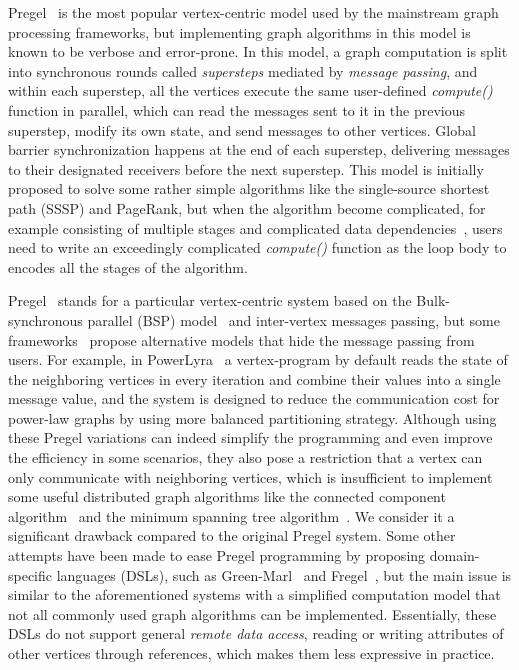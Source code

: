 \documentclass{sokendai_thesis} %
\begin{document}
Pregel~\cite{pregel} is the most popular vertex-centric model used by the mainstream graph processing frameworks, but implementing graph algorithms in this model is known to be verbose and error-prone.
In this model, a graph computation is split into synchronous rounds called \emph{supersteps} mediated by \emph{message passing}, and within each superstep, all the vertices execute the same user-defined \textit{compute()} function in parallel, which can read the messages sent to it in the previous superstep, modify its own state, and send messages to other vertices.
Global barrier synchronization happens at the end of each superstep, delivering messages to their designated receivers before the next superstep.
This model is initially proposed to solve some rather simple algorithms like the single-source shortest path (SSSP) and PageRank, but when the algorithm become complicated, for example consisting of multiple stages and complicated data dependencies~\cite{yan2014pregel}, users need to write an exceedingly complicated \textit{compute()} function as the loop body to encodes all the stages of the algorithm.


Pregel~\cite{pregel} stands for a particular vertex-centric system based on the Bulk-synchronous parallel (BSP) model~\cite{bsp} and inter-vertex messages passing, but some frameworks~\cite{low2012distributed,powergraph,powerlyra,graphmat,gemini,dathathri2018gluon} propose alternative models that hide the message passing from users.
For example, in PowerLyra~\cite{powerlyra} a vertex-program by default reads the state of the neighboring vertices in every iteration and combine their values into a single message value, and the system is designed to reduce the communication cost for power-law graphs by using more balanced partitioning strategy.
Although using these Pregel variations can indeed simplify the programming and even improve the efficiency in some scenarios, they also pose a restriction that a vertex can only communicate with neighboring vertices, which is insufficient to implement some useful distributed graph algorithms like the connected component algorithm~\cite{ShVi82,fastsv} and the minimum spanning tree algorithm~\cite{boruvka}.
We consider it a significant drawback compared to the original Pregel system.
Some other attempts have been made to ease Pregel programming by proposing domain-specific languages (DSLs), such as Green-Marl~\cite{green14} and Fregel~\cite{fregel}, but the main issue is similar to the aforementioned systems with a simplified computation model that not all commonly used graph algorithms can be implemented.
Essentially, these DSLs do not support general \emph{remote data access}, reading or writing attributes of other vertices through references, which makes them less expressive in practice.
\end{document}
